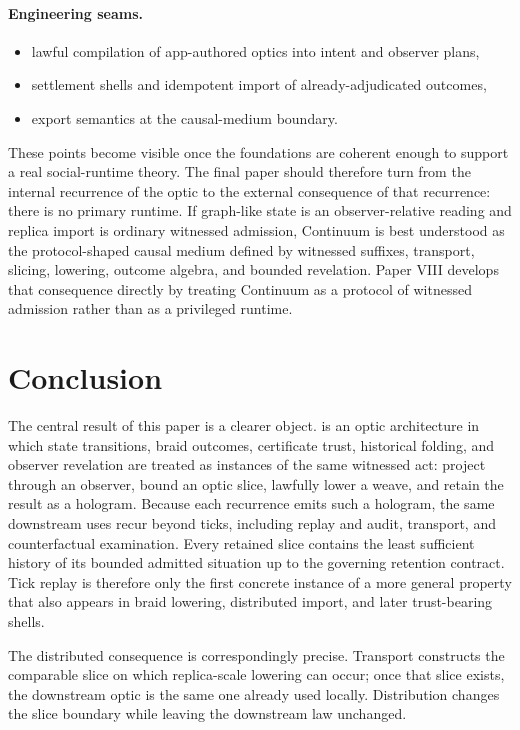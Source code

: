 \documentclass{aion}
\begin{document}
\paragraph{Engineering seams.}
\begin{itemize}[leftmargin=*]
	\item lawful compilation of app-authored optics into intent and observer plans,
	\item settlement shells and idempotent import of already-adjudicated outcomes,
	\item export semantics at the causal-medium boundary.
\end{itemize}

These points become visible once the foundations are coherent enough to support
a real social-runtime theory. The final paper should therefore turn from the
internal recurrence of the \WARP{} optic to the external consequence of that
recurrence: there is no primary runtime. If graph-like state is an
observer-relative reading and replica import is ordinary witnessed admission,
Continuum is best understood as the protocol-shaped causal medium defined by witnessed suffixes, transport, slicing,
lowering, outcome algebra, and bounded revelation.
Paper VIII develops that consequence directly by treating Continuum as a
protocol of witnessed admission rather than as a privileged runtime.

\clearpage
\section{Conclusion}
\label{sec:conclusion}

The central result of this paper is a clearer object. \WARP{} is an optic
architecture in which state transitions, braid outcomes, certificate trust,
historical folding, and observer revelation are treated as instances of the same
	witnessed act: project through an observer, bound an optic slice, lawfully lower
	a weave, and retain the result as a hologram. Because each recurrence emits such
	a hologram, the same downstream uses recur beyond ticks, including replay and
	audit, transport, and counterfactual examination. Every retained slice contains the least sufficient history of its bounded
	admitted situation up to the governing retention contract. Tick replay is
	therefore only the first concrete instance of a more general property that also
	appears in braid lowering, distributed import, and later trust-bearing shells.

The distributed consequence is correspondingly precise. Transport constructs the
comparable slice on which replica-scale lowering can occur; once that slice
exists, the downstream optic is the same one already used locally.
Distribution changes the slice boundary while leaving the downstream law
unchanged.
\end{document}
